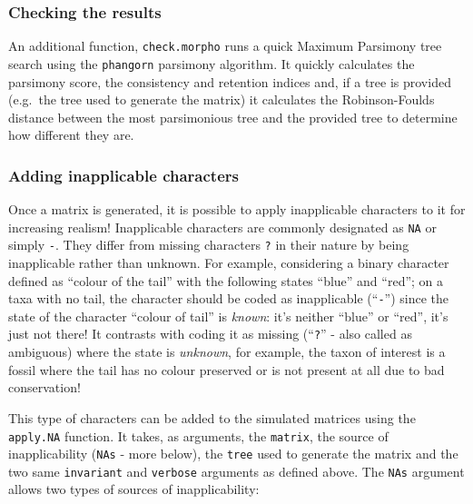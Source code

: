 \documentclass[]{book}
\theoremstyle{definition}
\theoremstyle{definition}
\theoremstyle{definition}
\theoremstyle{remark}
\begin{document}
\subsubsection{Checking the results}\label{checking-the-results}

An additional function, \texttt{check.morpho} runs a quick Maximum
Parsimony tree search using the \texttt{phangorn} parsimony algorithm.
It quickly calculates the parsimony score, the consistency and retention
indices and, if a tree is provided (e.g.~the tree used to generate the
matrix) it calculates the Robinson-Foulds distance between the most
parsimonious tree and the provided tree to determine how different they
are.

\subsubsection{Adding inapplicable
characters}\label{adding-inapplicable-characters}

Once a matrix is generated, it is possible to apply inapplicable
characters to it for increasing realism! Inapplicable characters are
commonly designated as \texttt{NA} or simply \texttt{-}. They differ
from missing characters \texttt{?} in their nature by being inapplicable
rather than unknown. For example, considering a binary character defined
as ``colour of the tail'' with the following states ``blue'' and
``red''; on a taxa with no tail, the character should be coded as
inapplicable (``\texttt{-}'') since the state of the character ``colour
of tail'' is \emph{known}: it's neither ``blue'' or ``red'', it's just
not there! It contrasts with coding it as missing (``\texttt{?}'' - also
called as ambiguous) where the state is \emph{unknown}, for example, the
taxon of interest is a fossil where the tail has no colour preserved or
is not present at all due to bad conservation!

This type of characters can be added to the simulated matrices using the
\texttt{apply.NA} function. It takes, as arguments, the \texttt{matrix},
the source of inapplicability (\texttt{NAs} - more below), the
\texttt{tree} used to generate the matrix and the two same
\texttt{invariant} and \texttt{verbose} arguments as defined above. The
\texttt{NAs} argument allows two types of sources of inapplicability:
\end{document}
